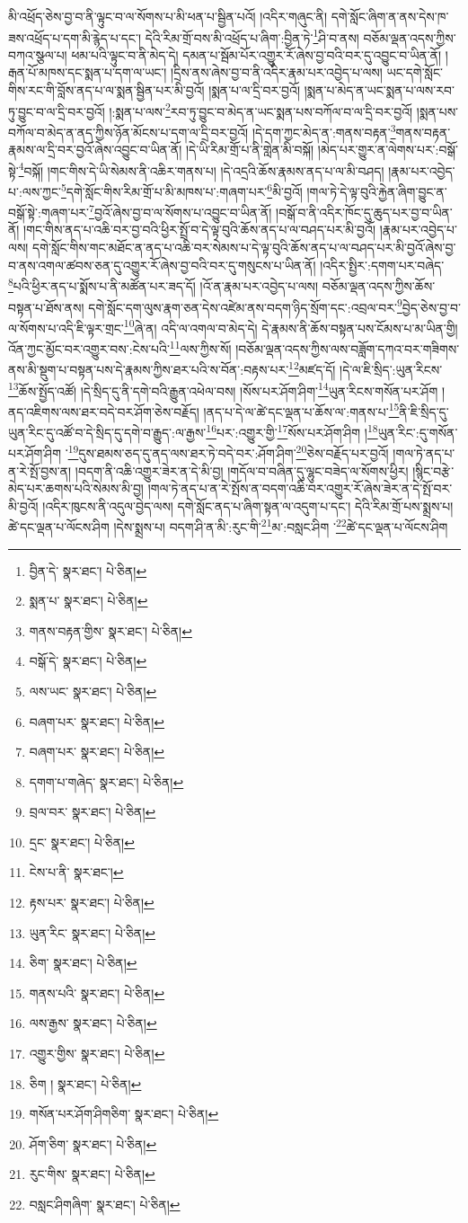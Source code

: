 མི་འཕྲོད་ཅེས་བྱ་བ་ནི་ལྟུང་བ་ལ་སོགས་པ་མི་ཕན་པ་སྦྱིན་པའོ། །འདིར་གཞུང་ནི། དགེ་སློང་ཞིག་ན་ནས་དེས་ཁ་ཟས་འཕྲོད་པ་དག་མི་རྙེད་པ་དང་། དེའི་རིམ་གྲོ་བས་མི་འཕྲོད་པ་ཞིག་:བྱིན་ཏེ་\footnote{བྱིན་དེ་  སྣར་ཐང་།  པེ་ཅིན། }ཤི་བ་ནས། བཅོམ་ལྡན་འདས་ཀྱིས་བཀའ་སྩལ་པ། ཕམ་པའི་ལྟུང་བ་ནི་མེད་དེ། དམན་པ་སྦོམ་པོར་འགྱུར་རོ་ཞེས་བྱ་བའི་བར་དུ་འབྱུང་བ་ཡིན་ནོ། །རྒན་པོ་མཁས་དང་སྨན་པ་དག་ལ་ཡང་། །དྲིས་ནས་ཞེས་བྱ་བ་ནི་འདིར་རྣམ་པར་འབྱེད་པ་ལས། ཡང་དགེ་སློང་གིས་རང་གི་བློས་ནད་པ་ལ་སྨན་སྦྱིན་པར་མི་བྱའོ། །སྨན་པ་ལ་དྲི་བར་བྱའོ། །སྨན་པ་མེད་ན་ཡང་སྨན་པ་ལས་རབ་ཏུ་བྱུང་བ་ལ་དྲི་བར་བྱའོ། །:སྨན་པ་ལས་\footnote{སྨན་པ་  སྣར་ཐང་།  པེ་ཅིན། }རབ་ཏུ་བྱུང་བ་མེད་ན་ཡང་སྨན་པས་བཀོལ་བ་ལ་དྲི་བར་བྱའོ། །སྨན་པས་བཀོལ་བ་མེད་ན་ནད་ཀྱིས་ཉོན་མོངས་པ་དག་ལ་དྲི་བར་བྱའོ། །དེ་དག་ཀྱང་མེད་ན་:གནས་བརྟན་\footnote{གནས་བརྟན་གྱིས་  སྣར་ཐང་།  པེ་ཅིན། }གནས་བརྟན་རྣམས་ལ་དྲི་བར་བྱའོ་ཞེས་འབྱུང་བ་ཡིན་ནོ། །དེ་ཡི་རིམ་གྲོ་པ་ནི་གླེན་མི་བསྐོ། །མེད་པར་གྱུར་ན་ལེགས་པར་:བསྒོ་སྟེ་\footnote{བསྒོ་དེ་  སྣར་ཐང་།  པེ་ཅིན། }བསྐོ། །གང་གིས་དེ་ཡི་སེམས་ནི་འཆིར་གནས་པ། །དེ་འདྲའི་ཆོས་རྣམས་ནད་པ་ལ་མི་བཤད། །རྣམ་པར་འབྱེད་པ་:ལས་ཀྱང་\footnote{ལས་ཡང་  སྣར་ཐང་།  པེ་ཅིན། }དགེ་སློང་གིས་རིམ་གྲོ་པ་མི་མཁས་པ་:གཞག་པར་\footnote{བཞག་པར་  སྣར་ཐང་།  པེ་ཅིན། }མི་བྱའོ། །གལ་ཏེ་དེ་ལྟ་བུའི་རྐྱེན་ཞིག་བྱུང་ན་བསྒོ་སྟེ་:གཞག་པར་\footnote{བཞག་པར་  སྣར་ཐང་།  པེ་ཅིན། }བྱའོ་ཞེས་བྱ་བ་ལ་སོགས་པ་འབྱུང་བ་ཡིན་ནོ། །བསྒོ་བ་ནི་འདིར་ཁོང་དུ་ཆུད་པར་བྱ་བ་ཡིན་ནོ། །གང་གིས་ནད་པ་འཆི་བར་བྱ་བའི་ཕྱིར་སྤྲོ་བ་དེ་ལྟ་བུའི་ཆོས་ནད་པ་ལ་བཤད་པར་མི་བྱའོ། །རྣམ་པར་འབྱེད་པ་ལས། དགེ་སློང་གིས་གང་མཐོང་ན་ནད་པ་འཆི་བར་སེམས་པ་དེ་ལྟ་བུའི་ཆོས་ནད་པ་ལ་བཤད་པར་མི་བྱའོ་ཞེས་བྱ་བ་ནས་འགལ་ཚབས་ཅན་དུ་འགྱུར་རོ་ཞེས་བྱ་བའི་བར་དུ་གསུངས་པ་ཡིན་ནོ། །འདིར་སྤྱིར་:དགག་པར་བཞེད་\footnote{དགག་པ་གཞེད་  སྣར་ཐང་།  པེ་ཅིན། }པའི་ཕྱིར་ནད་པ་སྨོས་པ་ནི་མཚོན་པར་ཟད་དོ། །འོ་ན་རྣམ་པར་འབྱེད་པ་ལས། བཅོམ་ལྡན་འདས་ཀྱིས་ཆོས་བསྟན་པ་ཐོས་ནས། དགེ་སློང་དག་ལུས་རྣག་ཅན་དེས་འཛེམ་ནས་བདག་ཉིད་སྲོག་དང་:འབྲལ་བར་\footnote{བྲལ་བར་  སྣར་ཐང་།  པེ་ཅིན། }བྱེད་ཅེས་བྱ་བ་ལ་སོགས་པ་འདི་ཇི་ལྟར་གྲང་\footnote{དྲང་  སྣར་ཐང་།  པེ་ཅིན། }ཞེ་ན། འདི་ལ་འགལ་བ་མེད་དེ། དེ་རྣམས་ནི་ཆོས་བསྟན་པས་ངོམས་པ་མ་ཡིན་གྱི། འོན་ཀྱང་མྱོང་བར་འགྱུར་བས་:ངེས་པའི་\footnote{ངེས་པ་ནི་  སྣར་ཐང་། }ལས་ཀྱིས་སོ། །བཅོམ་ལྡན་འདས་ཀྱིས་ལས་བཟློག་དཀའ་བར་གཟིགས་ནས་མི་སྡུག་པ་བསྟན་པས་དེ་རྣམས་ཀྱིས་ཐར་པའི་ས་བོན་:བརྟས་པར་\footnote{རྟས་པར་  སྣར་ཐང་།  པེ་ཅིན། }མཛད་དོ། །དེ་ལ་ཇི་སྲིད་:ཡུན་རིངས་\footnote{ཡུན་རིང་  སྣར་ཐང་།  པེ་ཅིན། }ཆོས་སྤྱོད་འཚོ། །དེ་སྲིད་དུ་ནི་དགེ་བའི་རྒྱུན་འཕེལ་བས། །སོས་པར་ཤོག་ཤིག་\footnote{ཅིག་  སྣར་ཐང་།  པེ་ཅིན། }ཡུན་རིངས་གསོན་པར་ཤོག །ནད་འཇིགས་ལས་ཐར་བདེ་བར་ཤོག་ཅེས་བརྗོད། །ནད་པ་དེ་ལ་ཚེ་དང་ལྡན་པ་ཆོས་ལ་:གནས་པ་\footnote{གནས་པའི་  སྣར་ཐང་།  པེ་ཅིན། }ནི་ཇི་སྲིད་དུ་ཡུན་རིང་དུ་འཚོ་བ་དེ་སྲིད་དུ་དགེ་བ་རྒྱུད་:ལ་རྒྱས་\footnote{ལས་རྒྱས་  སྣར་ཐང་།  པེ་ཅིན། }པར་:འགྱུར་གྱི་\footnote{འགྱུར་གྱིས་  སྣར་ཐང་།  པེ་ཅིན། }སོས་པར་ཤོག་ཤིག །\footnote{ཅིག །  སྣར་ཐང་།  པེ་ཅིན། }ཡུན་རིང་:དུ་གསོན་པར་ཤོག་ཤིག ་\footnote{གསོན་པར་ཤོག་ཤིགཅིག་  སྣར་ཐང་།  པེ་ཅིན། }དུས་ཐམས་ཅད་དུ་ནད་ལས་ཐར་ཏེ་བདེ་བར་:ཤོག་ཤིག་\footnote{ཤོག་ཅིག་  སྣར་ཐང་།  པེ་ཅིན། }ཅེས་བརྗོད་པར་བྱའོ། །གལ་ཏེ་ནད་པ་ན་རེ་སྤོ་བྱས་ན། །བདག་ནི་འཆི་འགྱུར་ཟེར་ན་དེ་མི་བྱ། །གདོལ་བ་བཞིན་དུ་ལྷུང་བཟེད་ལ་སོགས་ཕྱིར། །སྙིང་བརྩེ་མེད་པར་ཆགས་པའི་སེམས་མི་བྱ། །གལ་ཏེ་ནད་པ་ན་རེ་སྤོས་ན་བདག་འཆི་བར་འགྱུར་རོ་ཞེས་ཟེར་ན་དེ་སྤོ་བར་མི་བྱའོ། །འདིར་ཁུངས་ནི་འདུལ་བྱེད་ལས། དགེ་སློང་ནད་པ་ཞིག་སྟན་ལ་འདུག་པ་དང་། དེའི་རིམ་གྲོ་པས་སྨྲས་པ། ཚེ་དང་ལྡན་པ་ལོངས་ཤིག །དེས་སྨྲས་པ། བདག་ཤི་ན་མི་:རུང་གི་\footnote{རུང་གིས་  སྣར་ཐང་།  པེ་ཅིན། }མ་:བསླང་ཤིག ་\footnote{བསླང་ཤིགཞིག་  སྣར་ཐང་།  པེ་ཅིན། }ཚེ་དང་ལྡན་པ་ལོངས་ཤིག 